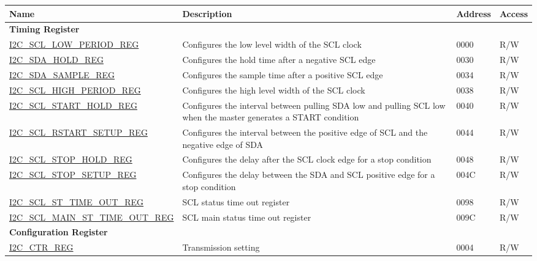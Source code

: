 \begin{longtable}{ | p{6cm} | p{7.2cm} | p{1.3cm} | p{1cm} | }
\hline\rowcolor{lightgray}
Name & Description &  Address & Access \\ \hline
\endhead
\multicolumn{4}{|l|}{\textbf{Timing Register}} \\ \hline
\hyperref[regdesc:I2CSCLLOWPERIODREG]{I2C\_SCL\_LOW\_PERIOD\_REG} & Configures the low level width of the SCL clock & \hexprefix{}0000 & R/W \\ \hline
\hyperref[regdesc:I2CSDAHOLDREG]{I2C\_SDA\_HOLD\_REG} & Configures the hold time after a negative SCL edge & \hexprefix{}0030 & R/W \\ \hline
\hyperref[regdesc:I2CSDASAMPLEREG]{I2C\_SDA\_SAMPLE\_REG} & Configures the sample time after a positive SCL edge & \hexprefix{}0034 & R/W \\ \hline
\hyperref[regdesc:I2CSCLHIGHPERIODREG]{I2C\_SCL\_HIGH\_PERIOD\_REG} & Configures the high level width of the SCL clock & \hexprefix{}0038 & R/W \\ \hline
\hyperref[regdesc:I2CSCLSTARTHOLDREG]{I2C\_SCL\_START\_HOLD\_REG} & Configures the interval between pulling SDA low and pulling SCL low when the master generates a START condition & \hexprefix{}0040 & R/W \\ \hline
\hyperref[regdesc:I2CSCLRSTARTSETUPREG]{I2C\_SCL\_RSTART\_SETUP\_REG} & Configures the interval between the positive
edge of SCL and the negative edge of SDA & \hexprefix{}0044 & R/W \\ \hline
\hyperref[regdesc:I2CSCLSTOPHOLDREG]{I2C\_SCL\_STOP\_HOLD\_REG} & Configures the delay after the SCL clock
edge for a stop condition & \hexprefix{}0048 & R/W \\ \hline
\hyperref[regdesc:I2CSCLSTOPSETUPREG]{I2C\_SCL\_STOP\_SETUP\_REG} & Configures the delay between the SDA and
SCL positive edge for a stop condition & \hexprefix{}004C & R/W \\ \hline
\hyperref[regdesc:I2CSCLSTTIMEOUTREG]{I2C\_SCL\_ST\_TIME\_OUT\_REG} & SCL status time out register & \hexprefix{}0098 & R/W \\ \hline
\hyperref[regdesc:I2CSCLMAINSTTIMEOUTREG]{I2C\_SCL\_MAIN\_ST\_TIME\_OUT\_REG} & SCL main status time out register & \hexprefix{}009C & R/W \\ \hline
\multicolumn{4}{|l|}{\textbf{Configuration Register}} \\ \hline
\hyperref[regdesc:I2CCTRREG]{I2C\_CTR\_REG} & Transmission setting & \hexprefix{}0004 & R/W \\ \hline

\end{longtable}
